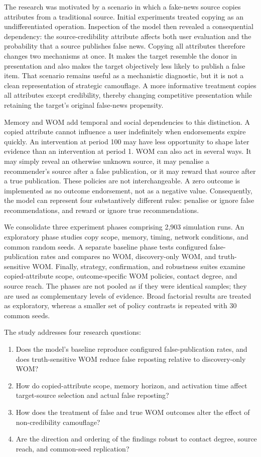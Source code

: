 The research was motivated by a scenario in which a fake-news source copies attributes from a traditional source. Initial experiments treated copying as an undifferentiated operation. Inspection of the model then revealed a consequential dependency: the source-credibility attribute affects both user evaluation and the probability that a source publishes false news. Copying all attributes therefore changes two mechanisms at once. It makes the target resemble the donor in presentation and also makes the target objectively less likely to publish a false item. That scenario remains useful as a mechanistic diagnostic, but it is not a clean representation of strategic camouflage. A more informative treatment copies all attributes except credibility, thereby changing competitive presentation while retaining the target's original false-news propensity.

Memory and WOM add temporal and social dependencies to this distinction. A copied attribute cannot influence a user indefinitely when endorsements expire quickly. An intervention at period 100 may have less opportunity to shape later evidence than an intervention at period 1. WOM can also act in several ways. It may simply reveal an otherwise unknown source, it may penalise a recommender's source after a false publication, or it may reward that source after a true publication. These policies are not interchangeable. A zero outcome is implemented as no outcome endorsement, not as a negative value. Consequently, the model can represent four substantively different rules: penalise or ignore false recommendations, and reward or ignore true recommendations.

We consolidate three experiment phases comprising 2,903 simulation runs. An exploratory phase studies copy scope, memory, timing, network conditions, and common random seeds. A separate baseline phase tests configured false-publication rates and compares no WOM, discovery-only WOM, and truth-sensitive WOM. Finally, strategy, confirmation, and robustness suites examine copied-attribute scope, outcome-specific WOM policies, contact degree, and source reach. The phases are not pooled as if they were identical samples; they are used as complementary levels of evidence. Broad factorial results are treated as exploratory, whereas a smaller set of policy contrasts is repeated with 30 common seeds.

The study addresses four research questions:

\begin{enumerate}
  \item Does the model's baseline reproduce configured false-publication rates, and does truth-sensitive WOM reduce false reposting relative to discovery-only WOM?
  \item How do copied-attribute scope, memory horizon, and activation time affect target-source selection and actual false reposting?
  \item How does the treatment of false and true WOM outcomes alter the effect of non-credibility camouflage?
  \item Are the direction and ordering of the findings robust to contact degree, source reach, and common-seed replication?
\end{enumerate}

